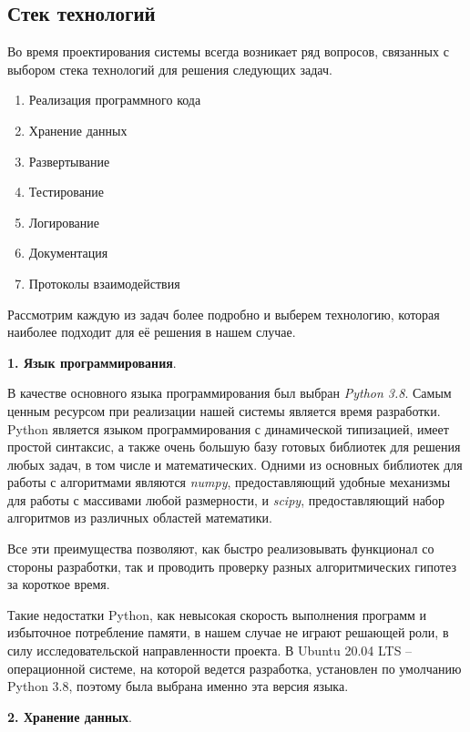 \subsection{\large{Стек технологий}}

Во время проектирования системы всегда возникает ряд вопросов,
связанных с выбором стека технологий для решения следующих задач.

\begin{enumerate}
    \item Реализация программного кода
    \item Хранение данных
    \item Развертывание
    \item Тестирование
    \item Логирование
    \item Документация
    \item Протоколы взаимодействия
\end{enumerate}

Рассмотрим каждую из задач более подробно и выберем технологию, которая наиболее подходит для её решения в нашем случае.

\noindent \textbf{1. Язык программирования}.

В качестве основного языка программирования был выбран \textit{Python 3.8}\cite{PythonReference}.
Самым ценным ресурсом при реализации нашей системы является время разработки. Python является языком программирования
с динамической типизацией, имеет простой синтаксис,
а также очень большую базу готовых библиотек для решения любых задач,
в том числе и математических. Одними из основных библиотек для работы с алгоритмами являются
\textit{numpy}, предоставляющий удобные механизмы для работы
с массивами любой размерности, и \textit{scipy}, предоставляющий набор алгоритмов из различных областей математики.

Все эти преимущества позволяют, как быстро реализовывать функционал со стороны разработки, так и проводить проверку
разных алгоритмических гипотез за короткое время.

Такие недостатки Python, как невысокая скорость выполнения программ и избыточное потребление памяти\cite{PythonProsAndCons},
в нашем случае не играют решающей роли, в силу исследовательской направленности проекта.
В Ubuntu 20.04 LTS -- операционной системе, на которой ведется разработка, установлен по умолчанию Python 3.8, поэтому
была выбрана именно эта версия языка.

\noindent \textbf{2. Хранение данных}.

